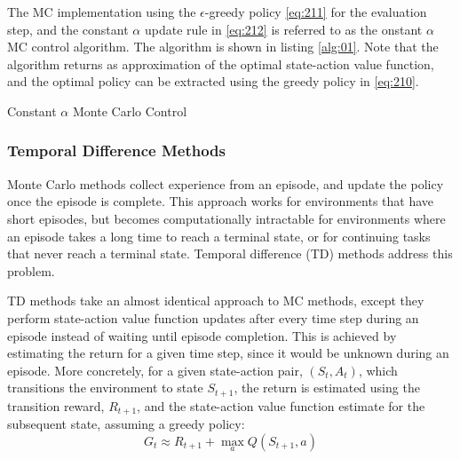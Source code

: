 The MC implementation using the $\epsilon$-greedy policy \ref{eq:211} for the evaluation step, and the constant $\alpha$ update rule in \ref{eq:212} is referred to as the onstant $\alpha$ MC control algorithm. The algorithm is shown in listing \ref{alg:01}. Note that the algorithm returns as approximation of the optimal state-action value function, and the optimal policy can be extracted using the greedy policy in \ref{eq:210}.

\begin{algorithm}[h]
	\caption{Constant $\alpha$ Monte Carlo Control}
	\label{alg:01_monte_carlo}
	\begin{algorithmic}[1]
				\EndIf
			\EndFor
		\EndFor
	\end{algorithmic} \label{alg:01}
\end{algorithm}


\subsubsection{Temporal Difference Methods}
Monte Carlo methods collect experience from an episode, and update the policy once the episode is complete. This approach works for environments that have short episodes, but becomes computationally intractable for environments where an episode takes a long time to reach a terminal state, or for continuing tasks that never reach a terminal state. Temporal difference (TD) methods address this problem.

TD methods take an almost identical approach to MC methods, except they perform state-action value function updates after every time step during an episode instead of waiting until episode completion. This is achieved by estimating the return for a given time step, since it would be unknown during an episode. More concretely, for a given state-action pair, $(S_t, A_t)$, which transitions the environment to state $S_{t+1}$, the return is estimated using the transition reward, $R_{t+1}$, and the state-action value function estimate for the subsequent state, assuming a greedy policy:
\begin{equation}
	G_t \approx R_{t+1} + \max_{a}Q(S_{t+1}, a) \label{eq:213}
\end{equation}

